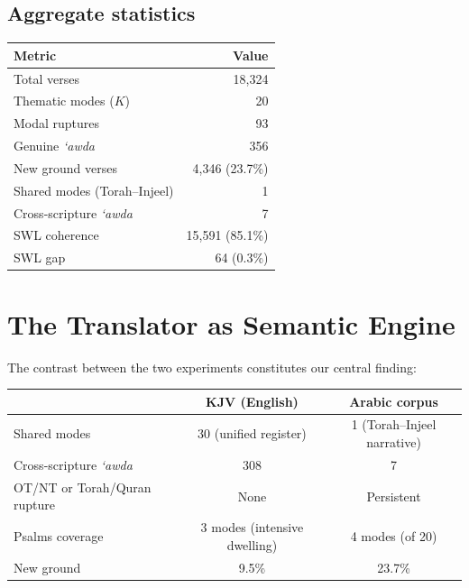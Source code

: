 \documentclass[11pt,a4paper]{article}
\theoremstyle{definition}
\begin{document}
\subsection{Aggregate statistics}

\begin{center}
\begin{tabular}{lr}
\toprule
\textbf{Metric} & \textbf{Value} \\
\midrule
Total verses & 18,324 \\
Thematic modes ($K$) & 20 \\
Modal ruptures & 93 \\
Genuine \emph{`awda} & 356 \\
New ground verses & 4,346 (23.7\%) \\
Shared modes (Torah--Injeel) & 1 \\
Cross-scripture \emph{`awda} & 7 \\
SWL coherence & 15,591 (85.1\%) \\
SWL gap & 64 (0.3\%) \\
\bottomrule
\end{tabular}
\end{center}


\section{The Translator as Semantic Engine}

The contrast between the two experiments constitutes our central finding:

\begin{center}
\begin{tabular}{lcc}
\toprule
 & \textbf{KJV (English)} & \textbf{Arabic corpus} \\
\midrule
Shared modes & 30 (unified register) & 1 (Torah--Injeel narrative) \\
Cross-scripture \emph{`awda} & 308 & 7 \\
OT/NT or Torah/Quran rupture & None & Persistent \\
Psalms coverage & 3 modes (intensive dwelling) & 4 modes (of 20) \\
New ground & 9.5\% & 23.7\% \\
\bottomrule
\end{tabular}
\end{center}
\end{document}
